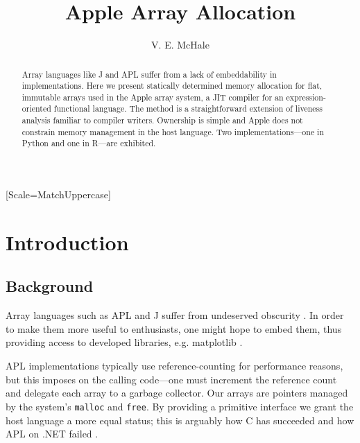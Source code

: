 \documentclass[sigplan,screen,anonymous]{acmart}
\begin{document}
\setmonofont{Jet Brains Mono}[Scale=MatchUppercase]

\begin{abstract}
    Array languages like J and APL suffer from a lack of embeddability in implementations.
    Here we present statically determined memory allocation for flat, immutable arrays used in the Apple array system, a JIT compiler for an expression-oriented functional language.
    The method is a straightforward extension of liveness analysis familiar to compiler writers.
    Ownership is simple and Apple does not constrain memory management in the host language.
    Two implementations---one in Python and one in R---are exhibited.
\end{abstract}

\title{Apple Array Allocation}
\author{V. E. McHale}
\maketitle

\section{Introduction}

\subsection{Background}

Array languages such as APL and J suffer from undeserved obscurity \cite{hsu2023}. In order to make them more useful to enthusiasts, one might hope to embed them, thus providing access to developed libraries, e.g. matplotlib \cite{hunter2007}.


APL implementations typically use reference-counting \cite[p.~47]{hui2020} for performance reasons, but this imposes on the calling code---one must increment the reference count and delegate each array to a garbage collector. Our arrays are pointers managed by the system's {\tt malloc} and {\tt free}. By providing a primitive interface we grant the host language a more equal status; this is arguably how C has succeeded \cite{kell2017} and how APL on .NET failed \cite[p.~12]{hui2020}.
\end{document}
